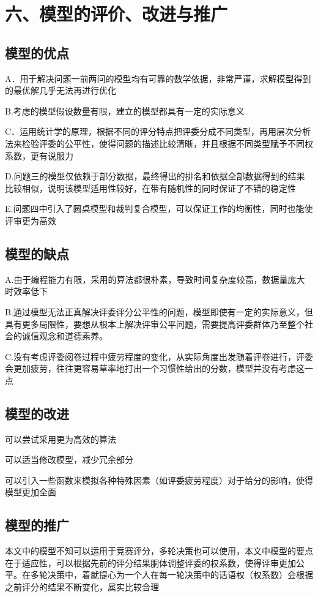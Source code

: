 \documentclass{my_paper}
\begin{document}
	\section{六、模型的评价、改进与推广}
	
	\subsection{模型的优点}
	A．用于解决问题一前两问的模型均有可靠的数学依据，非常严谨，求解模型得到的最优解几乎无法再进行优化
	
	B.考虑的模型假设数量有限，建立的模型都具有一定的实际意义
	
	C．运用统计学的原理，根据不同的评分特点把评委分成不同类型，再用层次分析法来检验评委的公平性，使得问题的描述比较清晰，并且根据不同类型赋予不同权系数，更有说服力
	
	D.问题三的模型仅依赖于部分数据，最终得出的排名和依据全部数据得到的结果比较相似，说明该模型适用性较好，在带有随机性的同时保证了不错的稳定性
	
	E.问题四中引入了圆桌模型和裁判复合模型，可以保证工作的均衡性，同时也能使评审更为高效
	\subsection{模型的缺点}
	A.由于编程能力有限，采用的算法都很朴素，导致时间复杂度较高，数据量庞大时效率低下
	
	B.通过模型无法正真解决评委评分公平性的问题，模型即使有一定的实际意义，但具有更多局限性，要想从根本上解决评审公平问题，需要提高评委群体乃至整个社会的诚信观念和道德素养。
	
	C.没有考虑评委阅卷过程中疲劳程度的变化，从实际角度出发随着评卷进行，评委会更加疲劳，往往更容易草率地打出一个习惯性给出的分数，模型并没有考虑这一点
	\subsection{模型的改进}
	
	可以尝试采用更为高效的算法
	
	可以适当修改模型，减少冗余部分
	
	可以引入一些函数来模拟各种特殊因素（如评委疲劳程度）对于给分的影响，使得模型更加全面
	
	
	\subsection{模型的推广}
	本文中的模型不知可以运用于竞赛评分，多轮决策也可以使用，本文中模型的要点在于适应性，可以根据先前的评分结果胴体调整评委的权系数，使得评审更加公平。在多轮决策中，着就提心为一个人在每一轮决策中的话语权（权系数）会根据之前评分的结果不断变化，属实比较合理
	
\end{document}
